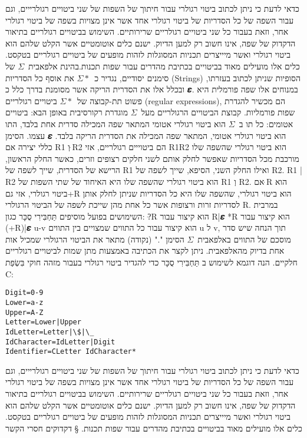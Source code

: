 כדאי לדעת כי ניתן לכתוב ביטוי רגולרי עבור חיתוך של השפות של שני ביטויים
רגולרייים, וגם עבור השפה של כל הסדריות של ביטוי רגולרי אחד אשר אינן מצויות בשפה
של ביטוי רגולרי אחר, וזאת בעבור כל שני ביטויים רגולריים שרירותיים. השימוש
בביטויים רגולריים בתיאור הדקדוק של שפה, אינו חשוב רק למען הדיוק. ישנם כלים
אוטומטיים אשר הקלט שלהם הוא ביטוי רגולרי ואשר מיייצרים תכניות המסוגלות לזהות
מופעים של ביטויים רגולריים בטקסט. כלים אלו מועילים מאוד בביטויים בכתיבת מהדרים
עבור שפות תכנות.בהינת אלפאבית~$Σ$ של סימנים יסודיים, נגדיר כ~$Σ*$ את אוסף כל הסדריות (Strings) הסופיות שניתן לכתוב בעזרתו, ובכלל אלו את הסדרית הריקה אשר מסומנת בדרך כלל כ 𝜺. במנוחים אלו שפה פורמלית היא פשוט תת-קבוצה של~$Σ*$ ביטויים רגולריים (regular expressions), הם מכשיר להגדרת שפות פורמליות.
קבוצת הביטויים הרגולריים מעל~$Σ$ מוגדרת רקורסיבית באופן הבא:
ביטויים אטומים:
כל תו ב~$Σ$ הוא ביטוי רגולרי אטומי המתאר שפה המכילה סדרית אחת בלבד, התו עצמו.
הסימן 𝜺 הוא ביטוי רגולרי אטומי, המתאר שפה המכילה את הסדרית הריקה בלבד.
כללי יצירה
אם R1 וְ ּR2 הם ביטוייים רגולריים, אזי
R1R2 הוא ביטוי רגולרי שהשפה שלו מורכבת מכל הסדריות שאפשר לחלק אותם לשני חלקים רצופים וזרים, כאשר החלק הראשון, הרישא של הסדרית, שייך לשפה של R1 ואילו החלק השני, הסיפא, שייך לשפה של R2.
R1 | R2 הוא ביטוי רגולרי שהשפה שלו היא האיחוד של שתי השפות של R1 וְ R2.
אם ּR הוא ביטוי רגולרי, אזי גם+R הוא ביטוי רגולרי, שהשפה שלו היא כל הסדריות שניתן לחלק אותן לסדריות זרות ורצופות אשר כל אחת מהן שייכת לשפה של הביטוי הרגולרי R.
במרבית השימושים בפועל מוסיפים תַּחְבִּירִי סֻכָּר כגון:
?ּR הוא קיצור עבור R|𝜺
*R הוא קיצור עבור (+R)|𝜺
u-v הוא קיצור עבור כל התווים שמצויים בין התווים u ל v, תוך הנחה שיש סדר מוסכם של התווים באלפאבית~$Σ$
הסימן "." (נקודה) מתאר את הביטוי הרגולרי שמכיל אות אחת בדיוק מהאלפאבית.
ניתן לקצר את הכתיבה באמצעות מתן שמות לביטויים רגולריים חלקיים.
הנה דוגמא לשימוש ב תַּחְבִּירִי סֻכָּר כדי להגדיר ביטוי רגולרי בעבור מזהה חוקי בִּשְׂפַת C:
\begin{verbatim}
Digit=0-9
Lower=a-z
Upper=A-Z
Letter=Lower|Upper
IdLetter=Letter|\$|\_
IdCharacter=IdLetter|Digit
Identifier=CLetter IdCharacter*
\end{verbatim}

כדאי לדעת כי ניתן לכתוב ביטוי רגולרי עבור חיתוך של השפות של שני ביטויים
רגולרייים, וגם עבור השפה של כל הסדריות של ביטוי רגולרי אחד אשר אינן מצויות בשפה
של ביטוי רגולרי אחר, וזאת בעבור כל שני ביטויים רגולריים שרירותיים. השימוש
בביטויים רגולריים בתיאור הדקדוק של שפה, אינו חשוב רק למען הדיוק. ישנם כלים
אוטומטיים אשר הקלט שלהם הוא ביטוי רגולרי ואשר מיייצרים תכניות המסוגלות לזהות
מופעים של ביטויים רגולריים בטקסט. כלים אלו מועילים מאוד בביטויים בכתיבת מהדרים
עבור שפות תכנות.
§ דקדוקים חסרי הקשר

